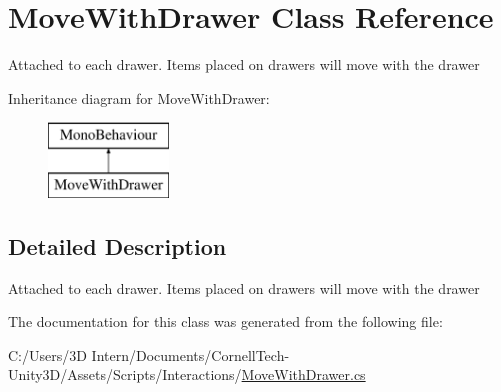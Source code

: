\hypertarget{class_move_with_drawer}{}\section{Move\+With\+Drawer Class Reference}
\label{class_move_with_drawer}


Attached to each drawer. Items placed on drawers will move with the drawer  


Inheritance diagram for Move\+With\+Drawer\+:\begin{figure}[H]
\begin{center}
\leavevmode
\includegraphics[height=2.000000cm]{class_move_with_drawer}
\end{center}
\end{figure}


\subsection{Detailed Description}
Attached to each drawer. Items placed on drawers will move with the drawer 



The documentation for this class was generated from the following file\+:\begin{DoxyCompactItemize}
\item 
C\+:/\+Users/3\+D Intern/\+Documents/\+Cornell\+Tech-\/\+Unity3\+D/\+Assets/\+Scripts/\+Interactions/\hyperlink{_move_with_drawer_8cs}{Move\+With\+Drawer.\+cs}\end{DoxyCompactItemize}
